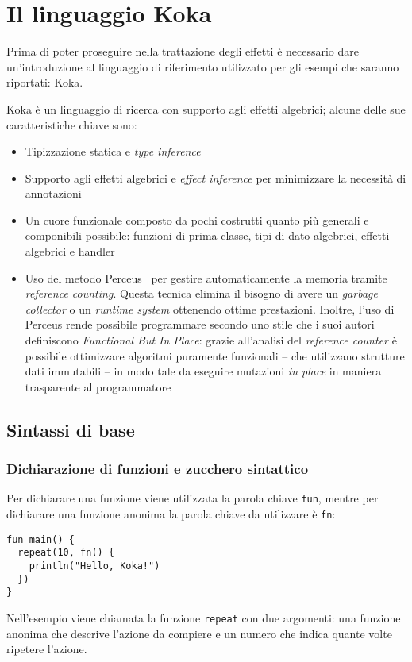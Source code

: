 \section{Il linguaggio Koka}
Prima di poter proseguire nella trattazione degli effetti è necessario dare un'introduzione al linguaggio di riferimento utilizzato per gli esempi che saranno riportati: Koka.

Koka è un linguaggio di ricerca con supporto agli effetti algebrici; alcune delle sue caratteristiche chiave sono:
\begin{itemize}
  \item Tipizzazione statica e \emph{type inference}
  \item Supporto agli effetti algebrici e \emph{effect inference} per minimizzare la necessità di annotazioni
  \item Un cuore funzionale composto da pochi costrutti quanto più generali e componibili possibile: funzioni di prima classe, tipi di dato algebrici, effetti algebrici e handler
  \item Uso del metodo Perceus~\cite{cit:perceus-garbage-free-reference-counting-with-reuse} per gestire automaticamente la memoria tramite \emph{reference counting}. Questa tecnica elimina il bisogno di avere un \emph{garbage collector} o un \emph{runtime system} ottenendo ottime prestazioni. Inoltre, l'uso di Perceus rende possibile programmare secondo uno stile che i suoi autori definiscono \emph{Functional But In Place}: grazie all'analisi del \emph{reference counter} è possibile ottimizzare algoritmi puramente funzionali -- che utilizzano strutture dati immutabili -- in modo tale da eseguire mutazioni \emph{in place} in maniera trasparente al programmatore~\cite{cit:koka-benchmarks}
\end{itemize}

\subsection{Sintassi di base}
\subsubsection{Dichiarazione di funzioni e zucchero sintattico}
Per dichiarare una funzione viene utilizzata la parola chiave \lstinline{fun}, mentre per dichiarare una funzione anonima la parola chiave da utilizzare è \lstinline{fn}:
\begin{lstlisting}[language=koka]
fun main() {
  repeat(10, fn() {
    println("Hello, Koka!")
  })
}
\end{lstlisting}
Nell'esempio viene chiamata la funzione \lstinline{repeat} con due argomenti: una funzione anonima che descrive l'azione da compiere e un numero che indica quante volte ripetere l'azione.

